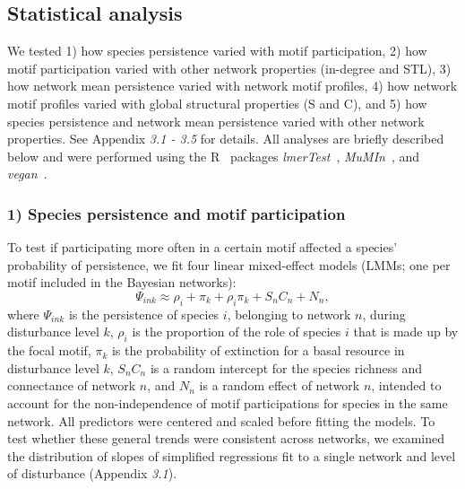 \documentclass[12pt]{article}
\begin{document}
\begin{spacing}{2.0}
	\subsection*{Statistical analysis} 

	We tested 1) how species persistence varied with motif participation, 2) how motif participation varied with other network properties (in-degree and STL), 3) how network mean persistence varied with network motif profiles, 4) how network motif profiles varied with global structural properties (S and C), and 5) how species persistence and network mean persistence varied with other network properties.
	See Appendix \emph{3.1 - 3.5} for details. 
	All analyses are briefly described below and were performed using the R~\citep{R} packages \emph{lmerTest}~\citep{lmerTest}, \emph{MuMIn}~\citep{MuMIn}, and \emph{vegan}~\citep{vegan}.

    
    \subsubsection*{1) Species persistence and motif participation}

        To test if participating more often in a certain motif affected a species' probability of persistence, we fit four linear mixed-effect models (LMMs; one per motif included in the Bayesian networks):
            \begin{equation}
                \Psi_{ink} \approx \rho_{i} + \pi_{k} + \rho_{i}\pi_{k} +
                S_{n}C_{n} + N_n,
                \label{propreq}
            \end{equation}
        \noindent where $\Psi_{ink}$ is the persistence of species $i$, belonging to network $n$, during disturbance level $k$, $\rho_{i}$ is the proportion of the role of species $i$ that is made up by the focal motif, $\pi_k$ is the probability of extinction for a basal resource in disturbance level $k$,  $S_{n}C_{n}$ is a random intercept for the species richness and connectance of network $n$, and $N_n$ is a random effect of network $n$, intended to account for the non-independence of motif participations for species in the same network.
        All predictors were centered and scaled before fitting the models.         
        To test whether these general trends were consistent across networks, we examined the distribution of slopes of simplified regressions fit to a single network and level of disturbance (Appendix \emph{3.1}).
    

\end{spacing}
\end{document}
